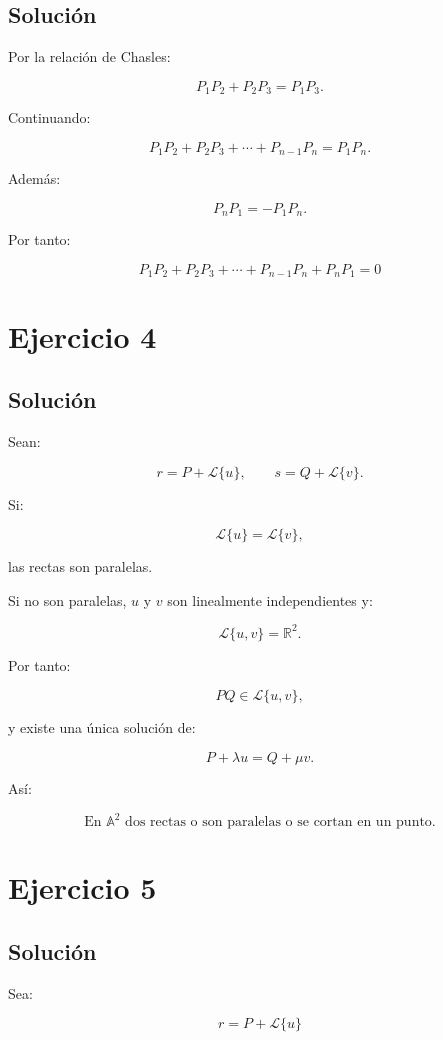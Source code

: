 \documentclass[11pt,a4paper]{article}
\newcommand{\R}{\mathbb{R}}
\begin{document}
\subsection{Solución}

Por la relación de Chasles:

\[
P_1P_2+P_2P_3=P_1P_3.
\]

Continuando:

\[
P_1P_2+P_2P_3+\cdots+P_{n-1}P_n
=
P_1P_n.
\]

Además:

\[
P_nP_1=-P_1P_n.
\]

Por tanto:

\[
\boxed{
P_1P_2+P_2P_3+\cdots+P_{n-1}P_n+P_nP_1=0
}
\]

\section{Ejercicio 4}
\subsection{Solución}

Sean:

\[
r=P+\mathcal L\{u\},
\qquad
s=Q+\mathcal L\{v\}.
\]

Si:

\[
\mathcal L\{u\}=\mathcal L\{v\},
\]

las rectas son paralelas.

Si no son paralelas, \(u\) y \(v\) son linealmente independientes y:

\[
\mathcal L\{u,v\}=\R^2.
\]

Por tanto:

\[
PQ\in\mathcal L\{u,v\},
\]

y existe una única solución de:

\[
P+\lambda u=Q+\mu v.
\]

Así:

\[
\boxed{
\text{En }\mathbb A^2\text{ dos rectas o son paralelas o se cortan en un punto.}
}
\]

\section{Ejercicio 5}
\subsection{Solución}

Sea:

\[
r=P+\mathcal L\{u\}
\]
\end{document}
